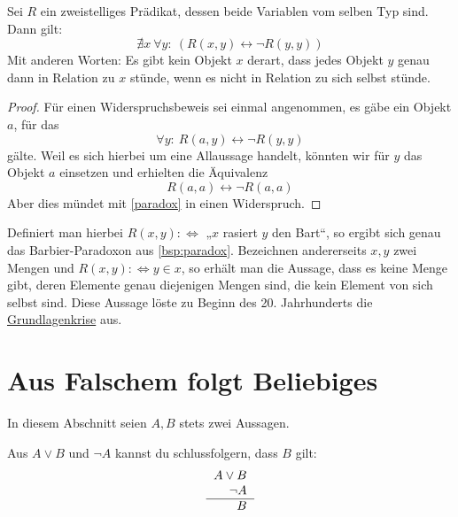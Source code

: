 \begin{satz} \label{russell} 
    Sei $R$ ein zweistelliges Prädikat, dessen beide Variablen vom selben Typ sind. Dann gilt:
        \[ \nexists x\ \forall y:\ (R(x,y) \leftrightarrow \neg R(y,y))\]
    Mit anderen Worten: Es gibt kein Objekt $x$ derart, dass jedes Objekt $y$ genau dann in Relation zu $x$ stünde, wenn es nicht in Relation zu sich selbst stünde.
\end{satz}
\begin{proof}
    Für einen Widerspruchsbeweis sei einmal angenommen, es gäbe ein Objekt $a$, für das
        \[ \forall y:\ R(a,y) \leftrightarrow \neg R(y,y) \]
    gälte. Weil es sich hierbei um eine Allaussage handelt, könnten wir für $y$ das Objekt $a$ einsetzen und erhielten die Äquivalenz
        \[ R(a,a) \leftrightarrow \neg R(a,a) \]
    Aber dies mündet mit \cref{paradox} in einen Widerspruch.
\end{proof}
 

\begin{vorschau}[*]
    Definiert man hierbei $R(x,y):\Leftrightarrow$ „$x$ rasiert $y$ den Bart“, so ergibt sich genau das Barbier-Paradoxon aus \cref{bsp:paradox}. Bezeichnen andererseits $x,y$ zwei Mengen und $R(x,y):\Leftrightarrow y\in x$, so erhält man die Aussage, dass es keine Menge gibt, deren Elemente genau diejenigen Mengen sind, die kein Element von sich selbst sind. Diese Aussage löste zu Beginn des 20. Jahrhunderts die \href{https://de.wikipedia.org/wiki/Grundlagenkrise_der_Mathematik}{Grundlagenkrise} aus.
\end{vorschau}
  
  

  
    
\section{Aus Falschem folgt Beliebiges}


In diesem Abschnitt seien $A,B$ stets zwei Aussagen.


\begin{axiom} \label{modustp}
    Aus $A\lor B$ und $\neg A$ kannst du schlussfolgern, dass $B$ gilt:
    \[\begin{tabular}{r}
        $A\lor B$ \\
        $\neg A$ \\
        \hline 
        $B$
    \end{tabular} \]
\end{axiom}


